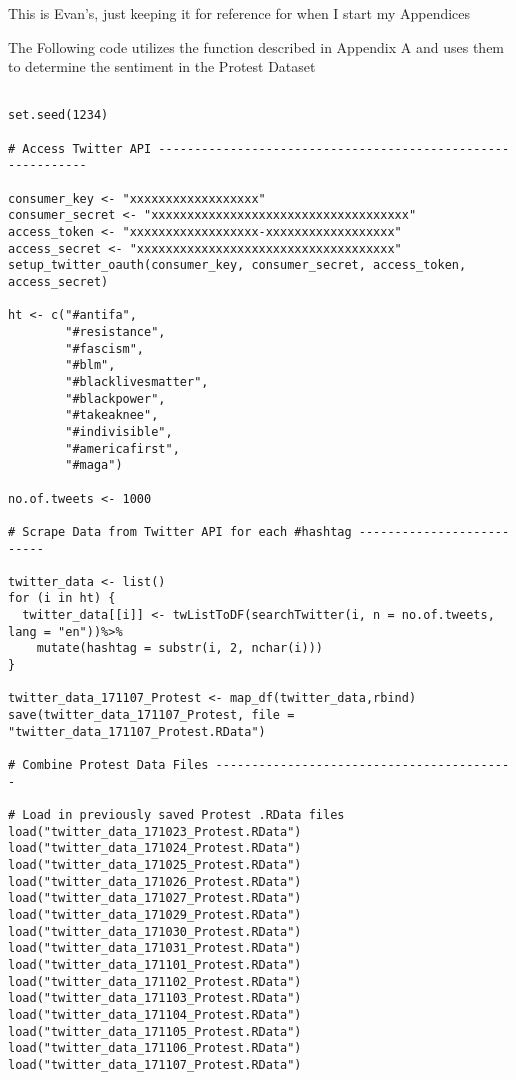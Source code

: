 This is Evan's, just keeping it for reference for when I start my Appendices 

The Following code utilizes the function described in Appendix A and uses them to determine the sentiment in the Protest Dataset



\begin{lstlisting}

set.seed(1234)

# Access Twitter API ------------------------------------------------------------

consumer_key <- "xxxxxxxxxxxxxxxxxx"
consumer_secret <- "xxxxxxxxxxxxxxxxxxxxxxxxxxxxxxxxxxxx"
access_token <- "xxxxxxxxxxxxxxxxxx-xxxxxxxxxxxxxxxxxx"
access_secret <- "xxxxxxxxxxxxxxxxxxxxxxxxxxxxxxxxxxxx"
setup_twitter_oauth(consumer_key, consumer_secret, access_token, access_secret)

ht <- c("#antifa", 
        "#resistance",
        "#fascism",
        "#blm",
        "#blacklivesmatter",
        "#blackpower",
        "#takeaknee",
        "#indivisible",
        "#americafirst",
        "#maga")

no.of.tweets <- 1000

# Scrape Data from Twitter API for each #hashtag --------------------------

twitter_data <- list()
for (i in ht) {
  twitter_data[[i]] <- twListToDF(searchTwitter(i, n = no.of.tweets, lang = "en"))%>% 
    mutate(hashtag = substr(i, 2, nchar(i)))
}

twitter_data_171107_Protest <- map_df(twitter_data,rbind)
save(twitter_data_171107_Protest, file = "twitter_data_171107_Protest.RData")

# Combine Protest Data Files ------------------------------------------

# Load in previously saved Protest .RData files
load("twitter_data_171023_Protest.RData")
load("twitter_data_171024_Protest.RData")
load("twitter_data_171025_Protest.RData")
load("twitter_data_171026_Protest.RData")
load("twitter_data_171027_Protest.RData")
load("twitter_data_171029_Protest.RData")
load("twitter_data_171030_Protest.RData")
load("twitter_data_171031_Protest.RData")
load("twitter_data_171101_Protest.RData")
load("twitter_data_171102_Protest.RData")
load("twitter_data_171103_Protest.RData")
load("twitter_data_171104_Protest.RData")
load("twitter_data_171105_Protest.RData")
load("twitter_data_171106_Protest.RData")
load("twitter_data_171107_Protest.RData")


\end{lstlisting}

